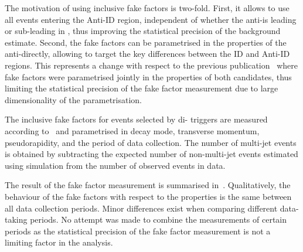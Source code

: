 {  %


  The motivation of using inclusive fake factors is two-fold. First,
  it allows to use all events entering the Anti-ID region, independent
  of whether the anti-\tauhadvis is leading or sub-leading in \pT,
  thus improving the statistical precision of the background
  estimate. Second, the fake factors can be parametrised in the
  properties of the anti-\tauhadvis directly, allowing to target the
  key differences between the ID and Anti-ID regions. This represents
  a change with respect to the previous
  publication~\cite{HIGG-2016-16-witherratum} where fake factors were
  parametrised jointly in the properties of both \tauhadvis
  candidates, thus limiting the statistical precision of the fake
  factor measurement due to large dimensionality of the
  parametrisation.}

The inclusive fake factors for events selected by di-\tauhadvis
triggers are measured according to~ and
parametrised in \tauhadvis decay mode, transverse momentum,
pseudorapidity, and the period of data collection. The number of
multi-jet events is obtained by subtracting the expected number of
non-multi-jet events estimated using simulation from the number of
observed events in data.

The result of the fake factor measurement is summarised
in~. Qualitatively, the behaviour of
the fake factors with respect to the \tauhadvis properties is the same
between all data collection periods. Minor differences exist when
comparing different data-taking periods. No attempt was made to
combine the measurements of certain periods as the statistical
precision of the fake factor measurement is not a limiting factor in
the analysis.

